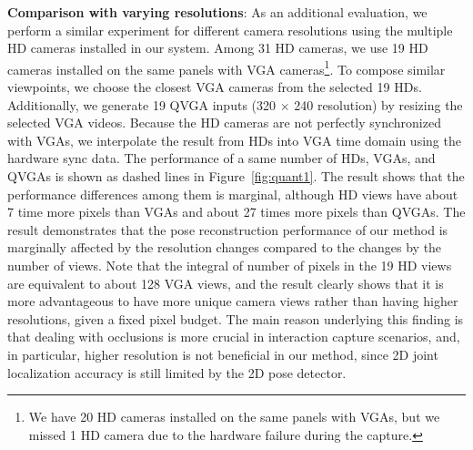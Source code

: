 \textbf{Comparison with varying resolutions}: As an additional evaluation, we perform a similar experiment for different camera resolutions using the multiple HD cameras installed in our system. Among 31 HD cameras, we use 19 HD cameras installed on the same panels with VGA cameras\footnote{We have 20 HD cameras installed on the same panels with VGAs, but we missed 1 HD camera due to the hardware failure during the capture.}.  To compose similar viewpoints, we choose the closest VGA cameras from the selected 19 HDs. Additionally, we generate 19 QVGA inputs (320 $\times$ 240 resolution)  by resizing the selected VGA videos. Because the HD cameras are not perfectly synchronized with VGAs, we interpolate the result from HDs into VGA time domain using the hardware sync data. The performance of a same number of HDs, VGAs, and QVGAs is shown as dashed lines in Figure~\ref{fig:quant1}. The result shows that the performance differences among them is marginal, although HD views have about 7 time more pixels than VGAs and about 27 times more pixels than QVGAs. The result demonstrates that the pose reconstruction performance of our method is marginally affected by the resolution changes compared to the changes by the number of views. Note that the integral of number of pixels in the 19 HD views are equivalent to about 128 VGA views, and the result clearly shows that it is more advantageous to have more unique camera views rather than having higher resolutions, given a fixed pixel budget. The main reason underlying this finding is that dealing with occlusions is more crucial in interaction capture scenarios, and, in particular, higher resolution is not beneficial in our method, since 2D joint localization accuracy is still limited by the 2D pose detector.

